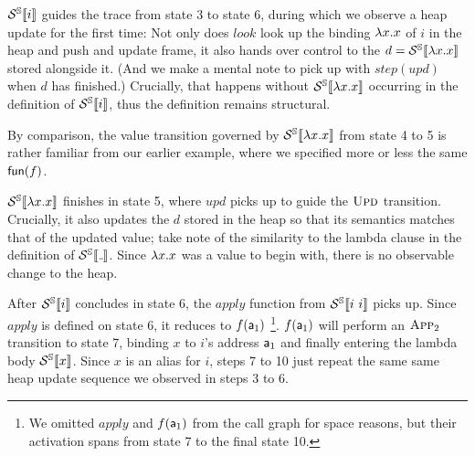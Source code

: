 $\mathcal{S}^{\mathbb{S}}\llbracket {i} \rrbracket$ guides the trace from state 3 to state 6, during which we
observe a heap update for the first time: Not only does $look$ look up
the binding $\lambda x. x$ of $i$ in the heap and push and update frame,
it also hands over control to the $d = \mathcal{S}^{\mathbb{S}}\llbracket {\lambda x. x} \rrbracket$ stored alongside it.
(And we make a mental note to pick up with $step(upd)$ when $d$ has finished.)
Crucially, that happens without $\mathcal{S}^{\mathbb{S}}\llbracket {\lambda x. x} \rrbracket$ occurring in the definition
of $\mathcal{S}^{\mathbb{S}}\llbracket {i} \rrbracket$, thus the definition remains structural.

By comparison, the value transition governed by $\mathcal{S}^{\mathbb{S}}\llbracket {\lambda x. x} \rrbracket$ from state
4 to 5 is rather familiar from our earlier example, where we specified more or
less the same $\mathsf{fun}(f)$.

$\mathcal{S}^{\mathbb{S}}\llbracket {\lambda x. x} \rrbracket$ finishes in state 5, where $upd$ picks up to guide the
$\textsc{Upd}$ transition. Crucially, it also updates the $d$ stored in the heap
so that its semantics matches that of the updated value; take note of the
similarity to the lambda clause in the definition of $\semst{\wild}$. Since
$\lambda x. x$ was a value to begin with, there is no observable change to the
heap.

After $\mathcal{S}^{\mathbb{S}}\llbracket {i} \rrbracket$ concludes in state 6, the $apply$ function from $\mathcal{S}^{\mathbb{S}}\llbracket {i~i} \rrbracket$
picks up. Since $apply$ is defined on state 6, it reduces to $f(\mathsf{a}_1)$%
\footnote{We omitted $apply$ and $f(\mathsf{a}_1)$ from the call graph for space reasons, but
their activation spans from state 7 to the final state 10.}.
$f(\mathsf{a}_1)$ will perform an $\textsc{App}_2$ transition to state 7, binding $x$ to $i$'s
address $\mathsf{a}_1$ and finally entering the lambda body $\mathcal{S}^{\mathbb{S}}\llbracket {x} \rrbracket$. Since $x$ is
an alias for $i$, steps 7 to 10 just repeat the same same heap update sequence
we observed in steps 3 to 6.

